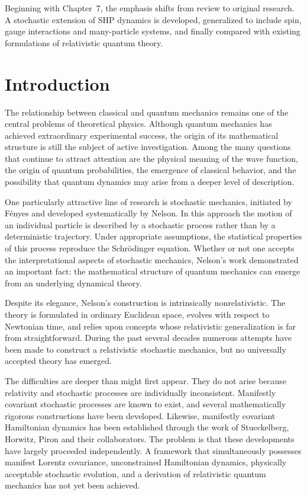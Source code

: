 Beginning with Chapter~7, the emphasis shifts from review to original
research. A stochastic extension of SHP dynamics is developed,
generalized to include spin, gauge interactions and many-particle
systems, and finally compared with existing formulations of relativistic
quantum theory.

\section{Introduction}

The relationship between classical and quantum mechanics remains one of
the central problems of theoretical physics. Although quantum mechanics
has achieved extraordinary experimental success, the origin of its
mathematical structure is still the subject of active investigation.
Among the many questions that continue to attract attention are the
physical meaning of the wave function, the origin of quantum
probabilities, the emergence of classical behavior, and the possibility
that quantum dynamics may arise from a deeper level of description.

One particularly attractive line of research is stochastic mechanics,
initiated by Fényes and developed systematically by Nelson. In this
approach the motion of an individual particle is described by a
stochastic process rather than by a deterministic trajectory. Under
appropriate assumptions, the statistical properties of this process
reproduce the Schrödinger equation. Whether or not one accepts the
interpretational aspects of stochastic mechanics, Nelson's work
demonstrated an important fact: the mathematical structure of quantum
mechanics can emerge from an underlying dynamical theory.

Despite its elegance, Nelson's construction is intrinsically
nonrelativistic. The theory is formulated in ordinary Euclidean space,
evolves with respect to Newtonian time, and relies upon concepts whose
relativistic generalization is far from straightforward. During the past
several decades numerous attempts have been made to construct a
relativistic stochastic mechanics, but no universally accepted theory
has emerged.

The difficulties are deeper than might first appear. They do not arise
because relativity and stochastic processes are individually
inconsistent. Manifestly covariant stochastic processes are known to
exist, and several mathematically rigorous constructions have been
developed. Likewise, manifestly covariant Hamiltonian dynamics has been
established through the work of Stueckelberg, Horwitz, Piron and their
collaborators. The problem is that these developments have largely
proceeded independently. A framework that simultaneously possesses
manifest Lorentz covariance, unconstrained Hamiltonian dynamics,
physically acceptable stochastic evolution, and a derivation of
relativistic quantum mechanics has not yet been achieved.

